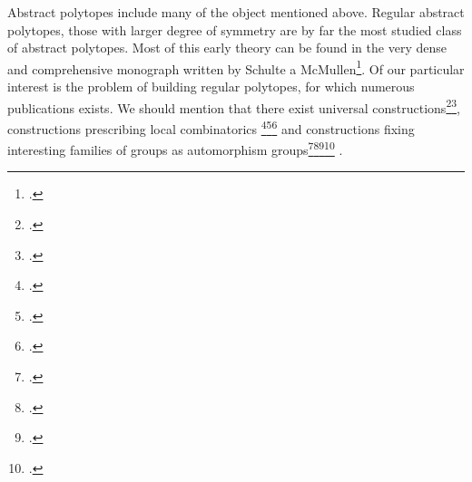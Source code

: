 
Abstract polytopes include many of the object mentioned above.
Regular abstract polytopes, those with larger degree of symmetry are by far the most studied class of abstract polytopes.
Most of this early theory can be found in the very dense and comprehensive monograph written by Schulte a McMullen\footcite{McMullenSchulte_2002_AbstractRegularPolytopes}.
Of our particular interest is the problem of building regular polytopes, for which numerous publications exists.
We should mention that there exist universal constructions\footcite{Schulte_1983_ArrangingRegularIncidence}\footcite{Schulte_1985_ExtensionsRegularComplexes}, constructions prescribing local combinatorics \footcite{Danzer_1984_RegularIncidenceComplexes}\footcite{ Pellicer_2009_ExtensionsRegularPolytopes}\footcite{ Pellicer_2010_ExtensionsDuallyBipartite} and constructions fixing interesting families of groups as automorphism groups\footcite{CameronFernandesLeemansMixer_2017_HighestRankPolytope}\footcite{FernandesLeemans_2018_CGroupsHigh}\footcite{ LeemansMoerenhoutOReillyRegueiro_2017_ProjectiveLinearGroups}\footcite{ Pellicer_2008_CprGraphsRegular} .

